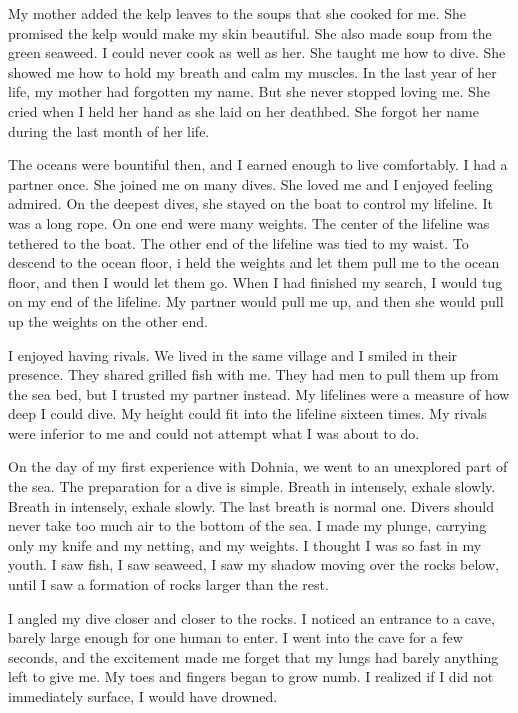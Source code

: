 \documentclass[12pt, letterpaper]{report}
\begin{document}
\vspace{1\baselineskip}
My mother added the kelp leaves to the soups that she cooked for me. She promised the kelp would make my skin beautiful. She also made soup from the green seaweed. I could never cook as well as her. She taught me how to dive. She showed me how to hold my breath and calm my muscles. In the last year of her life, my mother had forgotten my name. But she never stopped loving me. She cried when I held her hand as she laid on her deathbed. She forgot her name during the last month of her life.

\vspace{1\baselineskip}
The oceans were bountiful then, and I earned enough to live comfortably. I had a partner once. She joined me on many dives. She loved me and I enjoyed feeling admired. On the deepest dives, she stayed on the boat to control my lifeline. It was a long rope. On one end were many weights. The center of the lifeline was tethered to the boat. The other end of the lifeline was tied to my waist. To descend to the ocean floor, i held the weights and let them pull me to the ocean floor, and then I would let them go. When I had finished my search, I would tug on my end of the lifeline. My partner would pull me up, and then she would pull up the weights on the other end. 

\vspace{1\baselineskip}
I enjoyed having rivals. We lived in the same village and I smiled in their presence. They shared grilled fish with me. They had men to pull them up from the sea bed, but I trusted my partner instead. My lifelines were a measure of how deep I could dive. My height could fit into the lifeline sixteen times. My rivals were inferior to me and could not attempt what I was about to do. 

\vspace{1\baselineskip}
On the day of my first experience with Dohnia, we went to an unexplored part of the sea. The preparation for a dive is simple. Breath in intensely, exhale slowly. Breath in intensely, exhale slowly. The last breath is normal one. Divers should never take too much air to the bottom of the sea. I made my plunge, carrying only my knife and my netting, and my weights. I thought I was so fast in my youth. I saw fish, I saw seaweed, I saw my shadow moving over the rocks below, until I saw a formation of rocks larger than the rest. 

\vspace{1\baselineskip}
I angled my dive closer and closer to the rocks. I noticed an entrance to a cave, barely large enough for one human to enter. I went into the cave for a few seconds, and the excitement made me forget that my lungs had barely anything left to give me. My toes and fingers began to grow numb. I realized if I did not immediately surface, I would have drowned. 
\end{document}
